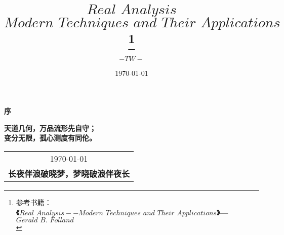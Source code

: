 \title{{\Huge{\textbf{$Real \,\, Analysis$}}}\\
	\Large{\textbf{$Modern \,\, Techniques \,\, and \,\, Their \,\, Applications$}}\footnote{参考书籍：\\
		\hspace*{4em} \textbf{《$Real \,\, Analysis -- Modern \,\, Techniques \,\, and \,\, Their \,\, Applications$》--- $Gerald \,\, B. \,\, Folland$} \\}}
\author{$-TW-$}
\date{\today}
\maketitle                   %

\thispagestyle{empty}        %
\begin{center}
	\Huge\textbf{序}
\end{center}


\vspace*{3em}
\begin{center}
	\large{\textbf{天道几何，万品流形先自守；}}\\
	
	\large{\textbf{变分无限，孤心测度有同伦。}}
\end{center}

\vspace*{3em}
\begin{flushright}
	\begin{tabular}{c}
		\today \\ \small{\textbf{长夜伴浪破晓梦，梦晓破浪伴夜长}}
	\end{tabular}
\end{flushright}


\newpage                      %
\pagestyle{plain}             %
\setcounter{page}{1}          %
\tableofcontents              %

\newpage                      %
\pagestyle{plain}
\setcounter{page}{1}          %
\setcounter{chapter}{-2}    %